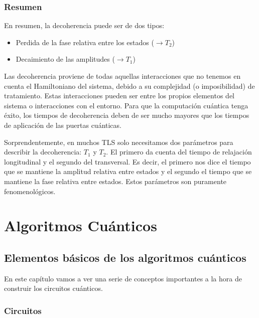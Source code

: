 \documentclass[a4paper,11pt]{book} %
\numberwithin{equation}{chapter}
\begin{document}
	\section{Resumen}

En resumen, la decoherencia puede ser de dos tipos:
\begin{itemize}
	\item Perdida de la fase relativa entre los estados ($\rightarrow T_2$)
	\item Decaimiento de las amplitudes ($\rightarrow T_1$)
\end{itemize}
Las decoherencia proviene de todas aquellas interacciones que no tenemos en cuenta el Hamiltoniano del sistema, debido a su complejidad (o imposibilidad) de tratamiento. Estas interacciones pueden ser entre los propios elementos del sistema o interacciones con el entorno. Para que la computación cuántica tenga éxito, los tiempos de decoherencia deben de ser mucho mayores que los tiempos de aplicación de las puertas cuánticas. 

Sorprendentemente, en muchos TLS solo necesitamos dos parámetros para describir la decoherencia: $T_1$ y $T_2$. El primero da cuenta del tiempo de relajación longitudinal y el segundo del transversal. Es decir, el primero nos dice el tiempo que se mantiene la amplitud relativa entre estados y el segundo el tiempo que se mantiene la fase relativa entre estados. Estos parámetros son puramente fenomenológicos.








	
	

\part{Algoritmos Cuánticos} \label{part_algoritmos}

\chapter{Elementos básicos de los algoritmos cuánticos}

En este capítulo vamos a ver una serie de conceptos importantes a la hora de construir los circuitos cuánticos.

	\section{Circuitos}
	
\end{document}
